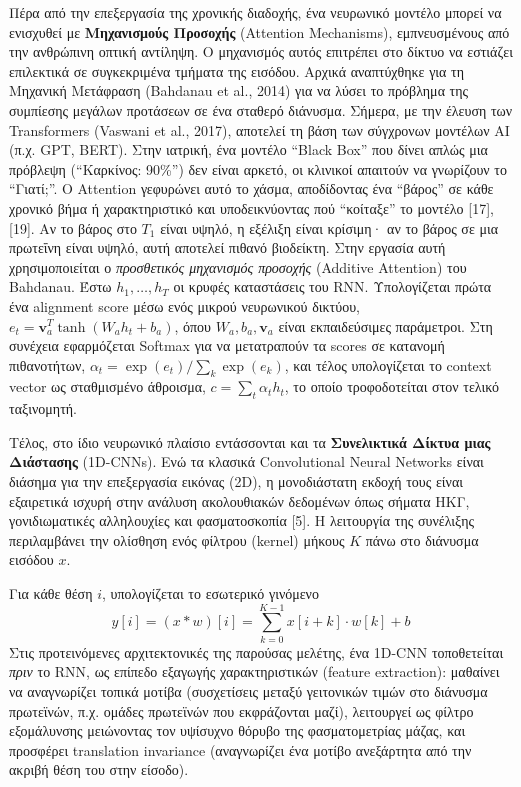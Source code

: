 Πέρα από την επεξεργασία της χρονικής διαδοχής, ένα νευρωνικό μοντέλο μπορεί να ενισχυθεί με \textbf{Μηχανισμούς Προσοχής} (Attention Mechanisms), εμπνευσμένους από την ανθρώπινη οπτική αντίληψη. Ο μηχανισμός αυτός επιτρέπει στο δίκτυο να εστιάζει επιλεκτικά σε συγκεκριμένα τμήματα της εισόδου. Αρχικά αναπτύχθηκε για τη Μηχανική Μετάφραση (Bahdanau et al., 2014) για να λύσει το πρόβλημα της συμπίεσης μεγάλων προτάσεων σε ένα σταθερό διάνυσμα. Σήμερα, με την έλευση των Transformers (Vaswani et al., 2017), αποτελεί τη βάση των σύγχρονων μοντέλων AI (π.χ. GPT, BERT). Στην ιατρική, ένα μοντέλο ``Black Box'' που δίνει απλώς μια πρόβλεψη (``Καρκίνος: 90\%'') δεν είναι αρκετό, οι κλινικοί απαιτούν να γνωρίζουν το ``Γιατί;''. Ο Attention γεφυρώνει αυτό το χάσμα, αποδίδοντας ένα ``βάρος'' σε κάθε χρονικό βήμα ή χαρακτηριστικό και υποδεικνύοντας πού ``κοίταξε'' το μοντέλο [17], [19]. Αν το βάρος στο $T_1$ είναι υψηλό, η εξέλιξη είναι κρίσιμη· αν το βάρος σε μια πρωτεΐνη είναι υψηλό, αυτή αποτελεί πιθανό βιοδείκτη. Στην εργασία αυτή χρησιμοποιείται ο \emph{προσθετικός μηχανισμός προσοχής} (Additive Attention) του Bahdanau. Έστω $h_1, \ldots, h_T$ οι κρυφές καταστάσεις του RNN. Υπολογίζεται πρώτα ένα alignment score μέσω ενός μικρού νευρωνικού δικτύου, $e_t = \mathbf{v}_a^T \tanh(W_a h_t + b_a)$, όπου $W_a, b_a, \mathbf{v}_a$ είναι εκπαιδεύσιμες παράμετροι. Στη συνέχεια εφαρμόζεται Softmax για να μετατραπούν τα scores σε κατανομή πιθανοτήτων, $\alpha_t = \exp(e_t) / \sum_k \exp(e_k)$, και τέλος υπολογίζεται το context vector ως σταθμισμένο άθροισμα, $c = \sum_t \alpha_t h_t$, το οποίο τροφοδοτείται στον τελικό ταξινομητή.

Τέλος, στο ίδιο νευρωνικό πλαίσιο εντάσσονται και τα \textbf{Συνελικτικά Δίκτυα μιας Διάστασης} (1D-CNNs). Ενώ τα κλασικά Convolutional Neural Networks είναι διάσημα για την επεξεργασία εικόνας (2D), η μονοδιάστατη εκδοχή τους είναι εξαιρετικά ισχυρή στην ανάλυση ακολουθιακών δεδομένων όπως σήματα ΗΚΓ, γονιδιωματικές αλληλουχίες και φασματοσκοπία [5]. Η λειτουργία της συνέλιξης περιλαμβάνει την ολίσθηση ενός φίλτρου (kernel) μήκους $K$ πάνω στο διάνυσμα εισόδου $x$. 

Για κάθε θέση $i$, υπολογίζεται το εσωτερικό γινόμενο
$$y[i] = (x * w)[i] = \sum_{k=0}^{K-1} x[i+k] \cdot w[k] + b$$
Στις προτεινόμενες αρχιτεκτονικές της παρούσας μελέτης, ένα 1D-CNN τοποθετείται \emph{πριν} το RNN, ως επίπεδο εξαγωγής χαρακτηριστικών (feature extraction): μαθαίνει να αναγνωρίζει τοπικά μοτίβα (συσχετίσεις μεταξύ γειτονικών τιμών στο διάνυσμα πρωτεϊνών, π.χ. ομάδες πρωτεϊνών που εκφράζονται μαζί), λειτουργεί ως φίλτρο εξομάλυνσης μειώνοντας τον υψίσυχνο θόρυβο της φασματομετρίας μάζας, και προσφέρει translation invariance (αναγνωρίζει ένα μοτίβο ανεξάρτητα από την ακριβή θέση του στην είσοδο).

